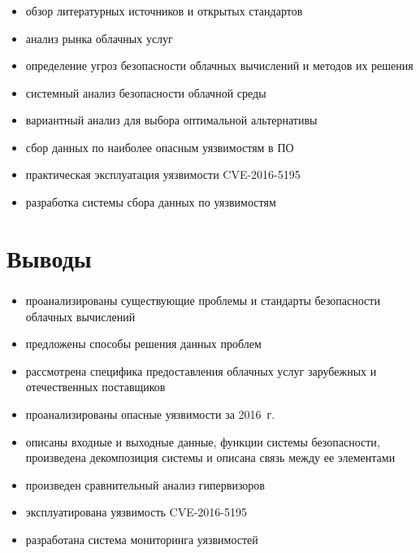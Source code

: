 \begin{frame}
\frametitle{\insertsection}

\begin{itemize}
    \item обзор литературных источников и открытых стандартов
    \item анализ рынка облачных услуг
    \item определение угроз безопасности облачных вычислений и методов их решения
    \item системный анализ безопасности облачной среды
    \item вариантный анализ для выбора оптимальной альтернативы
    \item сбор данных по наиболее опасным уязвимостям в ПО
    \item практическая эксплуатация уязвимости CVE-2016-5195
    \item разработка системы сбора данных по уязвимостям
\end{itemize}
\end{frame}


\section{Выводы}

\begin{frame}
\frametitle{\insertsection}

\begin{itemize}
    \item проанализированы существующие проблемы и стандарты безопасности облачных вычислений
    \item предложены способы решения данных проблем
    \item рассмотрена специфика предоставления облачных услуг зарубежных и отечественных поставщиков
    \item проанализированы опасные уязвимости за 2016~г.
    \item описаны входные и выходные данные, функции системы безопасности, произведена декомпозиция системы и описана связь между ее элементами
    \item произведен сравнительный анализ гипервизоров
    \item эксплуатирована уязвимость CVE-2016-5195
    \item разработана система мониторинга уязвимостей
\end{itemize}
\end{frame}

